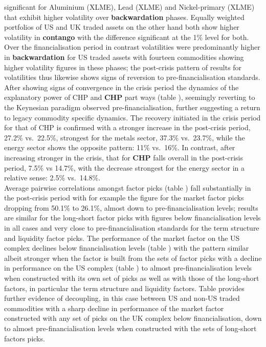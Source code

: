 \documentclass[
  authoryear,
  preprint,
  3p]{elsarticle}
\begin{document}
significant for Aluminium (XLME), Lead (XLME) and Nickel-primary (XLME)
that exhibit higher volatility over \textbf{backwardation} phases.
Equally weighted portfolios of US and UK traded assets on the other hand
both show higher volatility in \textbf{contango} with the difference
significant at the 1\% level for both. Over the financialisation period
in contrast volatilities were predominantly higher in
\textbf{backwardation} for US traded assets with fourteen commodities
showing higher volatility figures in these phases; the post-crisis
pattern of results for volatilities thus likewise shows signs of
reversion to pre-financialisation standards. After showing signs of
convergence in the crisis period the dynamics of the explanatory power
of CHP and \textbf{CHP} part ways (table ), seemingly reverting to the
Keynesian paradigm observed pre-financialisation, further suggesting a
return to legacy commodity specific dynamics. The recovery initiated in
the crisis period for that of CHP is confirmed with a stronger increase
in the post-crisis period, 27.2\% vs.~22.5\%, strongest for the metals
sector, 37.3\% vs.~23.7\%, while the energy sector shows the opposite
pattern: 11\% vs.~16\%. In contrast, after increasing stronger in the
crisis, that for \textbf{CHP} falls overall in the post-crisis period,
7.5\% vs 14.7\%, with the decrease strongest for the energy sector in a
relative sense: 2.5\% vs.~14.8\%.\\
Average pairwise correlations amongst factor picks (table ) fall
substantially in the post-crisis period with for example the figure for
the market factor picks dropping from 50.1\% to 26.1\%, almost down to
pre-financialisation levels; results are similar for the long-short
factor picks with figures below financialisation levels in all cases and
very close to pre-financialisation standards for the term structure and
liquidity factor picks. The performance of the market factor on the US
complex declines below financialisation levels (table ) with the pattern
similar albeit stronger when the factor is built from the sets of factor
picks with a decline in performance on the US complex (table ) to almost
pre-financialisation levels when constructed with its own set of picks
as well as with those of the long-short factors, in particular the term
structure and liquidity factors. Table provides further evidence of
decoupling, in this case between US and non-US traded commodities with a
sharp decline in performance of the market factor constructed with any
set of picks on the UK complex below financialisation, down to almost
pre-financialisation levels when constructed with the sets of long-short
factors picks.
\end{document}
